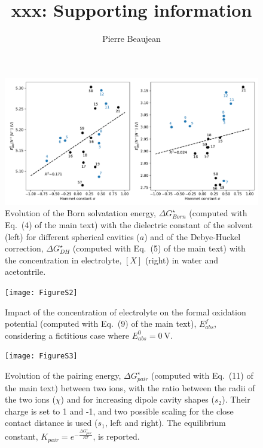\documentclass[11pt,a4paper]{article}
\title{xxx: Supporting information}
\author{Pierre Beaujean}
\begin{document}
\maketitle


\renewcommand{\thetable}{S\arabic{table}}
\renewcommand{\thefigure}{S\arabic{figure}}

\begin{figure}[!h]
	\centering
	\includegraphics [width=\linewidth]{FigureS1}
	\caption{Evolution of the Born solvatation energy, $\Delta G^\star_{Born}$ (computed with Eq.~(4) of the main text) with the dielectric constant of the solvent (left) for different spherical cavities ($a$) and of the Debye-Huckel correction, $\Delta G^\star_{DH}$  (computed with Eq.~(5) of the main text) with the concentration in electrolyte, $[X]$ (right) in water and acetontrile.}
\end{figure}

\begin{figure}[!h]
\centering
\texttt{[image: FigureS2]}
\caption{Impact of the concentration of electrolyte on the formal oxidation potential (computed with Eq.~(9) of the main  text), $E^f_{abs}$, considering a fictitious case where $E^0_{abs} = \SI{0}{\volt}$.}
\end{figure}

\begin{figure}[!h]
\centering
\texttt{[image: FigureS3]}
\caption{Evolution of the pairing energy, $\Delta G^\star_{pair}$ (computed with Eq.~(11) of the main text) between two ions, with the ratio between the radii of the two ions ($\chi$) and for increasing dipole cavity shapes ($s_2$). Their charge is set to 1 and -1, and two possible scaling for  the close contact distance is used ($s_1$, left and right). The equilibrium constant, $K_{pair} = e^{-\frac{\Delta G^\star_{pair}}{RT}}$, is reported. }
\end{figure}
\end{document}
